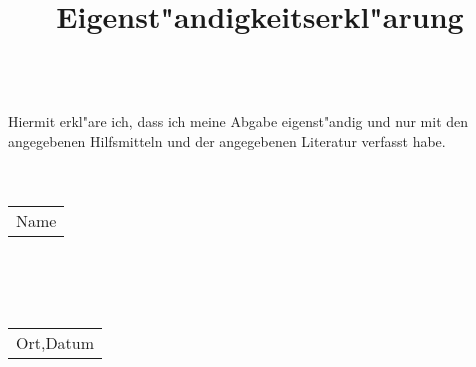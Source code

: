 \documentclass{article}
\title{Eigenst"andigkeitserkl"arung}
\date{}
\begin{document}
\maketitle
\ \\
Hiermit erkl"are ich, dass ich meine Abgabe eigenst"andig und nur mit den 
angegebenen Hilfsmitteln und der angegebenen Literatur verfasst habe.\\
\\
\\
\begin{tabular}{L{10cm}}
    \\
    \hline
    Name\\
\end{tabular}\\
\\
\\
\begin{tabular}{L{6cm}}
    \\
    \hline
    Ort,Datum\\
\end{tabular}
\end{document}
